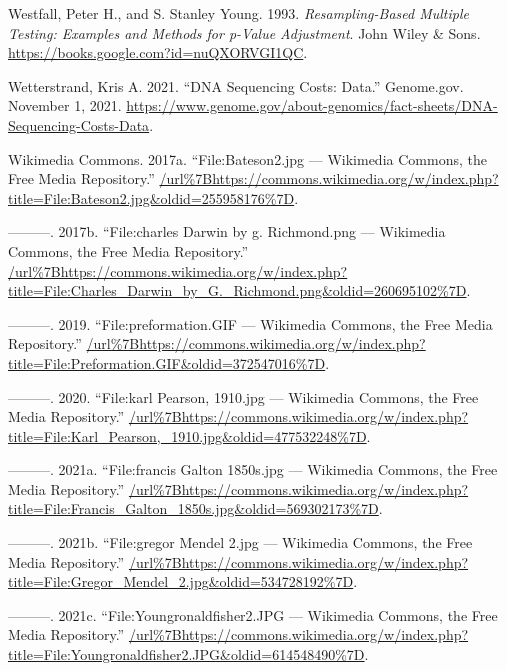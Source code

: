\documentclass[
]{book}
\newlength{\cslhangindent}
\newlength{\cslentryspacingunit} %
\newenvironment{CSLReferences}[2] %
 {%
  \setlength{\parindent}{0pt}
  \ifodd #1
  \let\oldpar\par
  \def\par{\hangindent=\cslhangindent\oldpar}
  \fi
  \setlength{\parskip}{#2\cslentryspacingunit}
 }%
 {}
\begin{document}
\begin{CSLReferences}{1}{0}
\leavevmode{}%
Westfall, Peter H., and S. Stanley Young. 1993. \emph{Resampling-{Based Multiple Testing}: {Examples} and {Methods} for p-{Value Adjustment}}. {John Wiley \& Sons}. \url{https://books.google.com?id=nuQXORVGI1QC}.

\leavevmode{}%
Wetterstrand, Kris A. 2021. {``{DNA Sequencing Costs}: {Data}.''} {Genome.gov}. November 1, 2021. \url{https://www.genome.gov/about-genomics/fact-sheets/DNA-Sequencing-Costs-Data}.

\leavevmode{}%
Wikimedia Commons. 2017a. {``File:Bateson2.jpg --- Wikimedia Commons{,} the Free Media Repository.''} \url{/url\%7Bhttps://commons.wikimedia.org/w/index.php?title=File:Bateson2.jpg\&oldid=255958176\%7D}.

\leavevmode{}%
---------. 2017b. {``File:charles Darwin by g. Richmond.png --- Wikimedia Commons{,} the Free Media Repository.''} \url{/url\%7Bhttps://commons.wikimedia.org/w/index.php?title=File:Charles_Darwin_by_G._Richmond.png\&oldid=260695102\%7D}.

\leavevmode{}%
---------. 2019. {``File:preformation.GIF --- Wikimedia Commons{,} the Free Media Repository.''} \url{/url\%7Bhttps://commons.wikimedia.org/w/index.php?title=File:Preformation.GIF\&oldid=372547016\%7D}.

\leavevmode{}%
---------. 2020. {``File:karl Pearson, 1910.jpg --- Wikimedia Commons{,} the Free Media Repository.''} \url{/url\%7Bhttps://commons.wikimedia.org/w/index.php?title=File:Karl_Pearson,_1910.jpg\&oldid=477532248\%7D}.

\leavevmode{}%
---------. 2021a. {``File:francis Galton 1850s.jpg --- Wikimedia Commons{,} the Free Media Repository.''} \url{/url\%7Bhttps://commons.wikimedia.org/w/index.php?title=File:Francis_Galton_1850s.jpg\&oldid=569302173\%7D}.

\leavevmode{}%
---------. 2021b. {``File:gregor Mendel 2.jpg --- Wikimedia Commons{,} the Free Media Repository.''} \url{/url\%7Bhttps://commons.wikimedia.org/w/index.php?title=File:Gregor_Mendel_2.jpg\&oldid=534728192\%7D}.

\leavevmode{}%
---------. 2021c. {``File:Youngronaldfisher2.JPG --- Wikimedia Commons{,} the Free Media Repository.''} \url{/url\%7Bhttps://commons.wikimedia.org/w/index.php?title=File:Youngronaldfisher2.JPG\&oldid=614548490\%7D}.


\end{CSLReferences}
\end{document}
